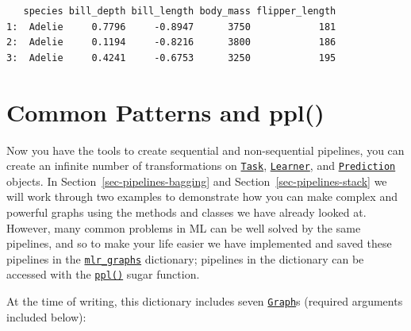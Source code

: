 \begin{Shaded}
\begin{Highlighting}[]
\SpecialCharTok{$}\NormalTok{(}\NormalTok{(}\NormalTok{))[[}\NormalTok{]]}\SpecialCharTok{$}\NormalTok{()[}\SpecialCharTok{:}\NormalTok{, }\SpecialCharTok{:}\NormalTok{]}
\end{Highlighting}
\end{Shaded}

\begin{verbatim}
   species bill_depth bill_length body_mass flipper_length
1:  Adelie     0.7796     -0.8947      3750            181
2:  Adelie     0.1194     -0.8216      3800            186
3:  Adelie     0.4241     -0.6753      3250            195
\end{verbatim}

\hypertarget{sec-pipelines-ppl}{%
\section{Common Patterns and ppl()}\label{sec-pipelines-ppl}}

Now you have the tools to create sequential and non-sequential
pipelines, you can create an infinite number of transformations on
\href{https://mlr3.mlr-org.com/reference/Task.html}{\texttt{Task}},
\href{https://mlr3.mlr-org.com/reference/Learner.html}{\texttt{Learner}},
and
\href{https://mlr3.mlr-org.com/reference/Prediction.html}{\texttt{Prediction}}
objects. In Section~\ref{sec-pipelines-bagging} and
Section~\ref{sec-pipelines-stack} we will work through two examples to
demonstrate how you can make complex and powerful graphs using the
methods and classes we have already looked at. However, many common
problems in ML can be well solved by the same pipelines, and so to make
your life easier we have implemented and saved these pipelines in the
\href{https://mlr3pipelines.mlr-org.com/reference/mlr_graphs.html}{\texttt{mlr\_graphs}}
dictionary; pipelines in the dictionary can be accessed with the
\href{https://mlr3pipelines.mlr-org.com/reference/ppl.html}{\texttt{ppl()}}
sugar function.

At the time of writing, this dictionary includes seven
\href{https://mlr3pipelines.mlr-org.com/reference/Graph.html}{\texttt{Graph}}s
(required arguments included below):

